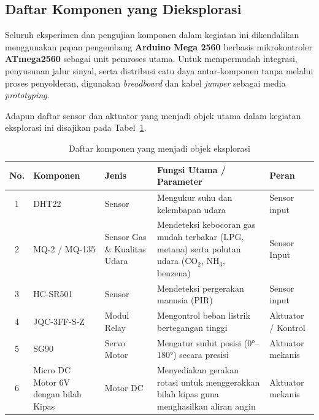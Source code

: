 \subsection{Daftar Komponen yang Dieksplorasi}
Seluruh eksperimen dan pengujian komponen dalam kegiatan ini dikendalikan menggunakan papan pengembang \textbf{Arduino Mega 2560} berbasis mikrokontroler \textbf{ATmega2560} sebagai unit pemroses utama. Untuk mempermudah integrasi, penyusunan jalur sinyal, serta distribusi catu daya antar-komponen tanpa melalui proses penyolderan, digunakan \textit{breadboard} dan kabel \textit{jumper} sebagai media \textit{prototyping}.

Adapun daftar sensor dan aktuator yang menjadi objek utama dalam kegiatan eksplorasi ini disajikan pada Tabel~\ref{tab:komponen_eksplorasi}.

\begin{table}[H]
\centering
\small
\caption{Daftar komponen yang menjadi objek eksplorasi}
\label{tab:komponen_eksplorasi}
\begin{tabularx}{\textwidth}{@{}c p{2.8cm} p{2.8cm} X p{2.8cm}@{}}
\toprule
\textbf{No.} & \textbf{Komponen} & \textbf{Jenis} & \textbf{Fungsi Utama / Parameter} & \textbf{Peran} \\
\midrule
1 & DHT22 & Sensor & Mengukur suhu dan kelembapan udara & Sensor input \\
2 & MQ-2 / MQ-135 & Sensor Gas \& Kualitas Udara & Mendeteksi kebocoran gas mudah terbakar (LPG, metana) serta polutan udara ($\text{CO}_2$, $\text{NH}_3$, benzena) & Sensor Input \\
3 & HC-SR501 & Sensor & Mendeteksi pergerakan manusia (PIR) & Sensor input \\
4 & JQC-3FF-S-Z & Modul Relay & Mengontrol beban listrik bertegangan tinggi & Aktuator / Kontrol \\
5 & SG90 & Servo Motor & Mengatur sudut posisi (\ang{0}--\ang{180}) secara presisi & Aktuator mekanis \\
6 & Micro DC Motor 6V dengan bilah Kipas & Motor DC & Menyediakan gerakan rotasi untuk menggerakkan bilah kipas guna menghasilkan aliran angin & Aktuator mekanis \\
\bottomrule
\end{tabularx}
\end{table}
